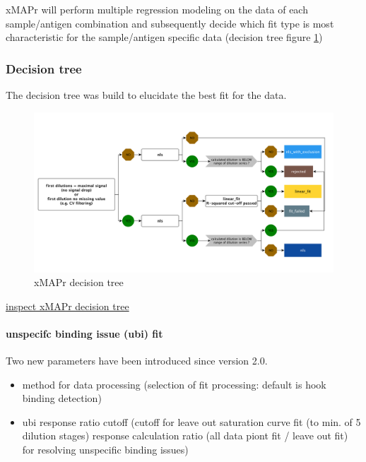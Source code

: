 \documentclass[
]{book}
\providecommand{\tightlist}{%
  \setlength{\itemsep}{0pt}\setlength{\parskip}{0pt}}
\begin{document}
xMAPr will perform multiple regression modeling on the data of each sample/antigen combination and subsequently decide which fit type is most characteristic for the sample/antigen specific data (decision tree figure \ref{fig:xMAPrDecTree})

\subsubsection{Decision tree}\label{decision-tree}

The decision tree was build to elucidate the best fit for the data.

\begin{figure}
\includegraphics[width=33.58in]{figures/fit_decision_tree_small} \caption{xMAPr decision tree}\label{fig:xMAPrDecTree}
\end{figure}

\href{figures/fit_decision_tree_small.png}{inspect xMAPr decision tree}

\paragraph{unspecifc binding issue (ubi) fit}\label{unspecifc-binding-issue-ubi-fit}

Two new parameters have been introduced since version 2.0.

\begin{itemize}
\tightlist
\item
  method for data processing (selection of fit processing: default is hook binding detection)
\item
  ubi response ratio cutoff (cutoff for leave out saturation curve fit (to min. of 5 dilution stages) response calculation ratio (all data piont fit / leave out fit) for resolving unspecific binding issues)
\end{itemize}
\end{document}
